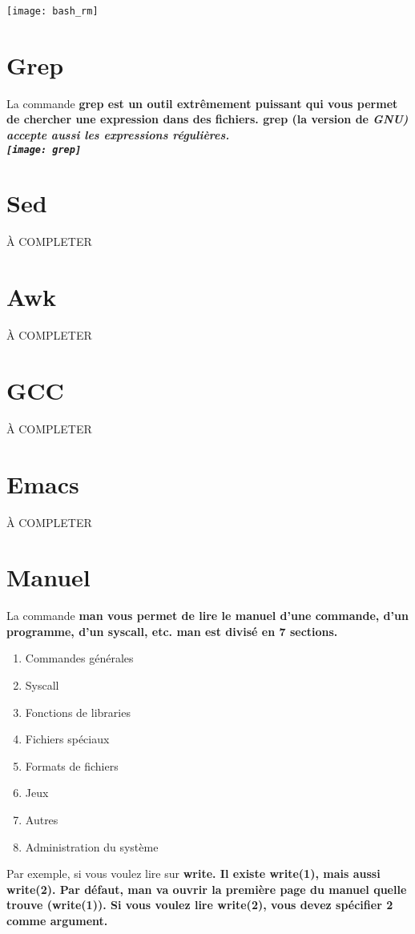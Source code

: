 \documentclass[12pt,oneside,final]{article}
\begin{document}
\texttt{[image: bash\_rm]} \\


\newpage
\section{Grep}
La commande \bf{grep} est un outil extrêmement puissant qui vous
permet de chercher une expression dans des fichiers. \bf{grep} (la
version de \it{GNU}) accepte aussi les expressions régulières. \\

\texttt{[image: grep]} \\


\section{Sed}
À COMPLETER
\section{Awk}
À COMPLETER
\section{GCC}
À COMPLETER
\section{Emacs}
À COMPLETER


\newpage
\section{Manuel}
La commande \bf{man} vous permet de lire le manuel d'une commande,
d'un programme, d'un syscall, etc. \bf{man} est divisé en 7 sections.

\begin{enumerate}[1]
\item Commandes générales
\item Syscall
\item Fonctions de libraries
\item Fichiers spéciaux
\item Formats de fichiers
\item Jeux
\item Autres
\item Administration du système
\end{enumerate}

Par exemple, si vous voulez lire sur \bf{write}. Il existe
\bf{write(1)}, mais aussi \bf{write(2)}. Par défaut, \bf{man} va
ouvrir la première page du manuel quelle trouve (\bf{write(1)}). Si
vous voulez lire \bf{write(2)}, vous devez spécifier 2 comme argument.
\end{document}
